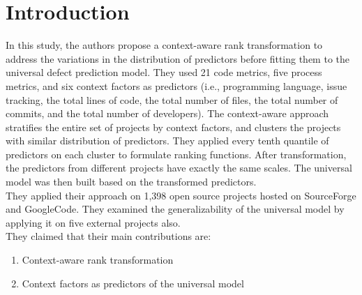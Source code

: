 \section{Introduction}
In this study, the authors propose a context-aware rank transformation to address the variations in the distribution of predictors before fitting them to the universal defect prediction model. They used 21 code metrics, five process metrics, and six context factors as predictors (i.e., programming language, issue tracking, the total lines of code, the total number of files, the total number of commits, and the total number of developers). The context-aware approach stratifies the entire set of projects by context factors, and clusters the
projects with similar distribution of predictors. They applied every tenth quantile of predictors on each cluster to formulate ranking functions. After transformation, the predictors from different projects have exactly the same scales. The universal model was then built based on the transformed predictors.\\
They applied their approach on 1,398 open source projects hosted on SourceForge and GoogleCode. They examined the generalizability of the universal model
by applying it on five external projects also.\\
They claimed that their main contributions are:

\begin{enumerate}
\bf\item Context-aware rank transformation

\bf\item Context factors as predictors of the universal model
\end{enumerate}


